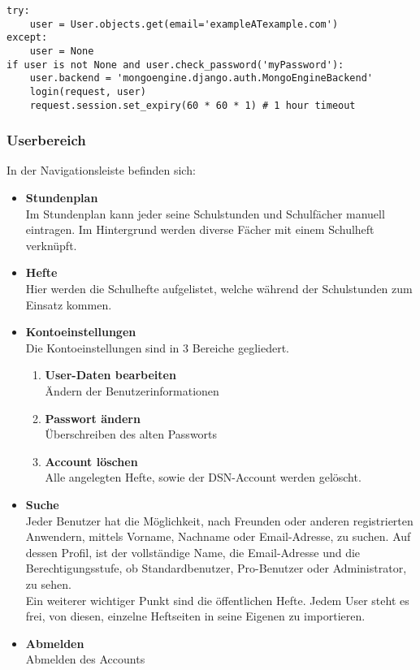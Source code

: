 \begin{lstlisting}[caption={Session Timeout}]
try:
    user = User.objects.get(email='exampleATexample.com')
except:
    user = None
if user is not None and user.check_password('myPassword'):
    user.backend = 'mongoengine.django.auth.MongoEngineBackend'
    login(request, user)
    request.session.set_expiry(60 * 60 * 1) # 1 hour timeout
\end{lstlisting}
\newpage 

\subsubsection{Userbereich}


In der Navigationsleiste befinden sich:
\begin{itemize}
\item \textbf{Stundenplan}\\ Im Stundenplan kann jeder seine Schulstunden und Schulfächer manuell eintragen. Im Hintergrund werden diverse Fächer mit einem Schulheft verknüpft.
\item \textbf{Hefte}\\ Hier werden die Schulhefte aufgelistet, welche während der Schulstunden zum Einsatz kommen.
\item \textbf{Kontoeinstellungen}\\ Die Kontoeinstellungen sind in 3 Bereiche gegliedert.
\begin{enumerate}
\item \textbf{User-Daten bearbeiten}\\ Ändern der Benutzerinformationen
\item \textbf{Passwort ändern}\\ Überschreiben des alten Passworts
\item \textbf{Account löschen}\\ Alle angelegten Hefte, sowie der DSN-Account werden gelöscht.
\end{enumerate}
\item \textbf{Suche}\\ Jeder Benutzer hat die Möglichkeit, nach Freunden oder anderen registrierten Anwendern, mittels Vorname, Nachname oder Email-Adresse, zu suchen. Auf dessen Profil, ist der vollständige Name, die Email-Adresse und die Berechtigungsstufe, ob Standardbenutzer, Pro-Benutzer oder Administrator, zu sehen.\\
Ein weiterer wichtiger Punkt sind die öffentlichen Hefte. Jedem User steht es frei, von diesen, einzelne Heftseiten in seine Eigenen zu importieren.
\item \textbf{Abmelden}\\ Abmelden des Accounts
\end{itemize}
\newpage 

